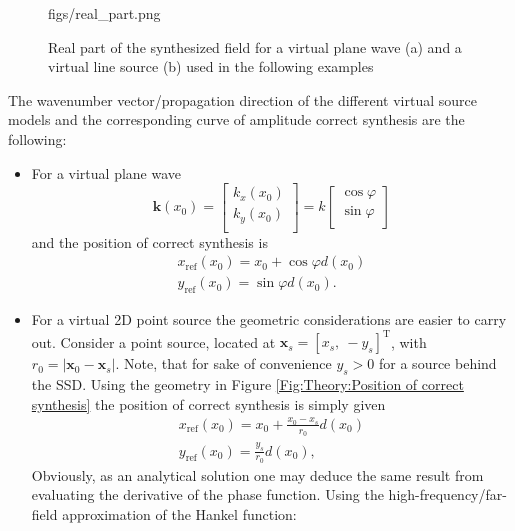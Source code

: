 \documentclass[12pt,a4paper]{article}
\newcommand{\sinfi}{\sin\varphi}
\newcommand{\cosfi}{\cos\varphi}
\newcommand{\vxo}{\mathbf{x}_0}
\begin{document}
\begin{figure}
	\centering
	\begin{overpic}[width = 1\columnwidth ]{figs/real_part.png}
	\scriptsize
	\end{overpic}
\caption{Real part of the synthesized field for a virtual plane wave (a) and a virtual line source (b) used in the following examples}
	\label{Fig:Theory:Real_part}
\end{figure}

The wavenumber vector/propagation direction of the different virtual source models and the corresponding curve of amplitude correct synthesis are the following:
\begin{itemize}
\item For a virtual plane wave 
\begin{equation}
\mathbf{k}(x_0) = \begin{bmatrix} k_x(x_0) \\[0.3em] k_y(x_0)\\[0.3em]    \end{bmatrix} =  k\begin{bmatrix} \cosfi \\[0.3em] \sinfi \\[0.3em]    \end{bmatrix}
\end{equation}
and the position of correct synthesis is 
\begin{eqnarray}
x_{\mathrm{ref}}(x_0) = x_0 + \cosfi d(x_0) \\
y_{\mathrm{ref}}(x_0) = \sinfi d(x_0).
\end{eqnarray}
\item For a virtual 2D point source the geometric considerations are easier to carry out. Consider a point source, located at $\mathbf{x}_s = [ x_s,\ -y_s ]^{\mathrm{T}}$, with $r_0 = | \vxo - \mathbf{x}_s |$. Note, that for sake of convenience $y_s>0$ for a source behind the SSD. Using the geometry in Figure \ref{Fig:Theory:Position of correct synthesis} the position of correct synthesis is simply given 
\begin{eqnarray}
x_{\mathrm{ref}}(x_0) = x_0 + \frac{x_0-x_s}{r_0} d(x_0) \\
y_{\mathrm{ref}}(x_0) = \frac{y_s}{r_0} d(x_0),
\label{Eq:Line_source_correcty_synth}
\end{eqnarray}
Obviously, as an analytical solution one may deduce the same result from evaluating the derivative of the phase function. Using the high-frequency/far-field approximation of the Hankel function:
\begin{equation} 

\end{equation}
\end{itemize}
\end{document}

